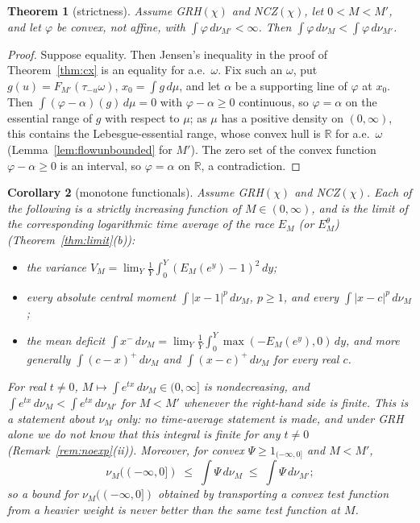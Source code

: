\documentclass[11pt]{amsart}
\newtheorem{theorem}{Theorem}[section]
\newtheorem{corollary}[theorem]{Corollary}
\theoremstyle{definition}
\numberwithin{equation}{section}
\newcommand{\Ein}{E^{\theta}}
\begin{document}
\begin{theorem}[strictness]\label{thm:strict}
Assume GRH$(\chi)$ and NCZ$(\chi)$, let $0<M<M'$, and let $\varphi$
be convex, not affine, with $\int\varphi\,d\nu_{M'}<\infty$. Then
$\int\varphi\,d\nu_M<\int\varphi\,d\nu_{M'}$.
\end{theorem}

\begin{proof}
Suppose equality. Then Jensen's inequality in the proof of
Theorem~\ref{thm:cx} is an equality for a.e.\ $\omega$. Fix such an
$\omega$, put $g(u)=F_{M'}(\tau_{-u}\omega)$, $x_0=\int g\,d\mu$, and
let $\alpha$ be a supporting line of $\varphi$ at $x_0$. Then
$\int(\varphi-\alpha)(g)\,d\mu=0$ with $\varphi-\alpha\ge0$
continuous, so $\varphi=\alpha$ on the essential range of $g$ with
respect to $\mu$; as $\mu$ has a positive density on $(0,\infty)$,
this contains the Lebesgue-essential range, whose convex hull is
$\mathbb R$ for a.e.\ $\omega$ (Lemma~\ref{lem:flowunbounded} for
$M'$). The zero set of the convex function $\varphi-\alpha\ge0$ is an
interval, so $\varphi=\alpha$ on $\mathbb R$, a contradiction.
\end{proof}

\begin{corollary}[monotone functionals]\label{cor:mono}
Assume GRH$(\chi)$ and NCZ$(\chi)$. Each of the following is a
strictly increasing function of $M\in(0,\infty)$, and is the limit of
the corresponding logarithmic time average of the race $E_M$ (or
$\Ein_M$) (Theorem~\ref{thm:limit}(b)):
\begin{itemize}
\item the variance
$V_M=\lim_Y\frac1Y\int_0^Y(E_M(e^y)-1)^2\,dy$;
\item every absolute central moment $\int|x-1|^p\,d\nu_M$, $p\ge1$,
and every $\int|x-c|^p\,d\nu_M$;
\item the \emph{mean deficit}
$\int x^-\,d\nu_M=\lim_Y\frac1Y\int_0^Y\max(-E_M(e^y),0)\,dy$, and
more generally $\int(c-x)^+\,d\nu_M$ and $\int(x-c)^+\,d\nu_M$ for
every real $c$.
\end{itemize}
For real $t\ne0$, $M\mapsto\int e^{tx}\,d\nu_M\in(0,\infty]$ is
nondecreasing, and $\int e^{tx}\,d\nu_M<\int e^{tx}\,d\nu_{M'}$ for
$M<M'$ whenever the right-hand side is finite. This is a statement
about $\nu_M$ only: no time-average statement is made, and under GRH
alone we do not know that this integral is finite for any $t\ne0$
(Remark~\ref{rem:noexp}(ii)). Moreover, for convex
$\Psi\ge1_{(-\infty,0]}$ and $M<M'$,
\begin{equation}\label{eq:transport}
\nu_M((-\infty,0])\;\le\;\int\Psi\,d\nu_M\;\le\;\int\Psi\,d\nu_{M'} ;
\end{equation}
so a bound for $\nu_M((-\infty,0])$ obtained by transporting a convex
test function from a heavier weight is never better than the same
test function at $M$.
\end{corollary}
\end{document}

